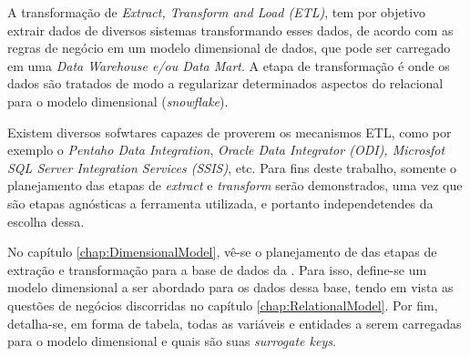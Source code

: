 A transformação de \emph{Extract, Transform and Load (ETL)}, tem por objetivo extrair dados de diversos sistemas transformando esses dados, de acordo com as regras de negócio em um modelo dimensional de dados, que pode ser carregado em uma \emph{Data Warehouse e/ou Data Mart}. A etapa de transformação é onde os dados são tratados de modo a regularizar determinados aspectos do relacional para o modelo dimensional (\emph{snowflake}). 

Existem diversos sofwtares capazes de proverem os mecanismos ETL, como por exemplo o \emph{Pentaho Data Integration}, \emph{Oracle Data Integrator (ODI), Microsfot SQL Server Integration Services (SSIS)}, etc. Para fins deste trabalho, somente o planejamento das etapas de \emph{extract} e \emph{transform} serão demonstrados, uma vez que são etapas agnósticas a ferramenta utilizada, e portanto independetendes da escolha dessa.

No capítulo \ref{chap:DimensionalModel}, vê-se o planejamento de das etapas de extração e transformação para  a base de dados da \emph{\databaseName{}}. Para isso, define-se um modelo dimensional a ser abordado para os dados dessa base, tendo em vista as questões de negócios discorridas no capítulo \ref{chap:RelationalModel}. Por fim, detalha-se, em forma de tabela, todas as variáveis e entidades a serem carregadas para o modelo dimensional e quais são suas \emph{surrogate keys}.

